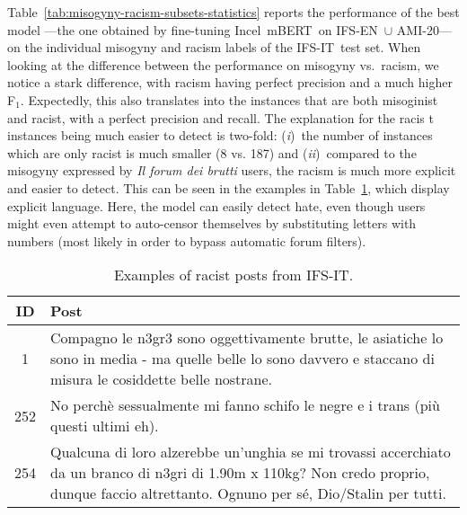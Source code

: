 \documentclass[11pt]{article}
\newcommand{\Ni}{({\em i})~}
\newcommand{\Nii}{({\em ii})~}
\newcommand{\abc}[1]{{\color{blue} #1}}
\newcommand{\dsENclassification}{IFS-EN}
\newcommand{\dsITclassification}{IFS-IT}
\newcommand{\imbert}{\mbox{Incel mBERT}}
\newcommand{\ami}{\mbox{AMI-20}}
\newcommand{\itforum}{\textit{Il forum dei brutti}}
\begin{document}
Table~\ref{tab:misogyny-racism-subsets-statistics} reports the performance of the best model ---the one obtained by fine-tuning \imbert\, on \dsENclassification\, $\cup$ \ami--- on the individual misogyny and racism labels of the \dsITclassification\, test set.
When looking at the difference between the performance on misogyny vs.\ racism, we notice a stark difference, with racism having perfect precision and a much higher F$_1$. Expectedly, this also translates into the \abc{instances that are both misoginist and racist, with } %
a perfect precision and recall. %
The explanation for the racis\abc{t instances} being much easier to detect is two-fold:
\Ni the number of instances which are only racist is much smaller (8 vs. 187) and
\Nii  compared to the misogyny expressed by \itforum{} users, the racism is much more explicit and easier to detect.
This can be seen in the examples in Table~\ref{tab:examples}, which display explicit language. Here, the model can easily detect hate, even though users might even attempt to auto-censor themselves by substituting letters with numbers (most likely in order to bypass automatic forum filters).


\begin{table}
  \centering
  \caption{Examples of racist posts from \dsITclassification.}
  \label{tab:examples}
  \begin{tabular}{cp{6cm}}
  \hline
  \bf ID & \bf Post \\
  \hline
  1 & Compagno le n3gr3 sono oggettivamente brutte, le asiatiche lo sono in media - ma quelle belle lo sono davvero e staccano di misura le cosiddette belle nostrane. \\
  \hline
  252 & No perchè sessualmente mi fanno schifo le negre e i trans (più questi ultimi eh). \\
  \hline
  254 & Qualcuna di loro alzerebbe un'unghia se mi trovassi accerchiato da un branco di n3gri di 1.90m x 110kg? Non credo proprio, dunque faccio altrettanto. Ognuno per sé, Dio/Stalin per tutti. \\
  \hline
  \end{tabular}
\end{table}

\end{document}
